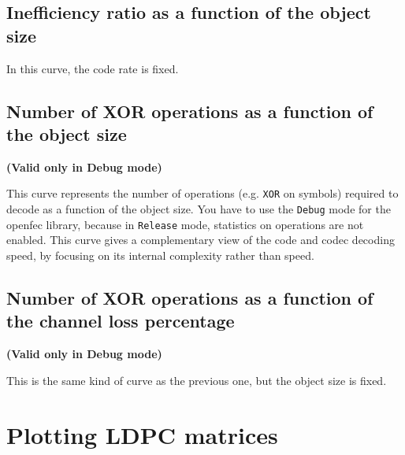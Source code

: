 \documentclass[a4paper,11pt]{article}
\begin{document}
{\subsection{Inefficiency ratio as a function of the object size}

In this curve, the code rate is fixed.


\subsection{Number of XOR operations as a function of the object size}

{\bf (Valid only in Debug mode)}

This curve represents the number of operations (e.g. \verb+XOR+ on symbols) required to decode as
a function of the object size.
You have to use the \verb+Debug+ mode for the openfec library, because in \verb+Release+ mode,
statistics on operations are not enabled.
This curve gives a complementary view of the code and codec decoding speed, by focusing on
its internal complexity rather than speed.


\subsection{Number of XOR operations as a function of the channel loss percentage}

{\bf (Valid only in Debug mode)}

This is the same kind of curve as the previous one, but the object size is fixed.




\section{Plotting LDPC matrices}
\label{sec:plot_matrices}

\begin{flushright}
\end{flushright}

}
\end{document}
